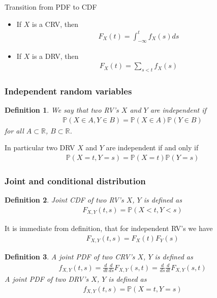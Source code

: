 \documentclass[10pt]{article}
\newtheorem*{definition}{Definition}
\begin{document}
Transition from PDF to CDF
\begin{itemize}
\item If $X$ is a CRV, then
\begin{align}
F_X(t)=\int_{-\infty}^t f_X(s)ds
\end{align}
\item If $X$ is a DRV, then
\begin{align}
F_X(t)=\sum_{s<t}f_X(s)
\end{align}
\end{itemize}

\subsubsection{Independent random variables}

\begin{definition} We say that two RV's $X$ and $Y$ are independent if
\begin{align}
\mathbb{P}(X\in A, Y\in B)=\mathbb{P}(X\in A)\mathbb{P}(Y\in B)
\end{align}
for all $A\subset\mathbb{R}$, $B\subset\mathbb{R}$. 
\end{definition}

In particular two DRV $X$ and $Y$ are independent if and only if
\begin{align}
\mathbb{P}(X=t, Y=s)=\mathbb{P}(X=t)\mathbb{P}(Y=s)
\end{align}


\subsubsection{Joint and conditional distribution}

\begin{definition} Joint CDF of two RV's $X$, $Y$ is defined as
\begin{align}
F_{X,Y}(t,s)=\mathbb{P}(X<t,Y<s)
\end{align}
\end{definition}
It is immediate from definition, that for independent RV's we have
\begin{align}
F_{X,Y}(t,s)=F_X(t)F_Y(s)
\end{align}

\begin{definition} A joint PDF of two CRV's $X$, $Y$ is defined as
\begin{align}
f_{X,Y}(t,s)=\frac{d}{dt}\frac{d}{ds}F_{X,Y}(s,t)=\frac{d}{ds}\frac{d}{dt}F_{X,Y}(s,t)
\end{align}
A joint PDF of two DRV's $X$, $Y$ is defined as
\begin{align}
f_{X,Y}(t,s)=\mathbb{P}(X=t,Y=s)
\end{align}
\end{definition}
\end{document}
